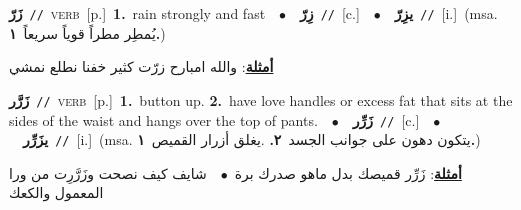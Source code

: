 \documentclass[10pt,a4paper,twoside]{article} %
\begin{document}
\begin{multicols}{2}
{\setlength\topsep{0pt}\textbf{\foreignlanguage{arabic}{زَرّ}}\ {\color{gray}\texttt{//}\color{black}}\ \textsc{verb}\ [p.]\ \textbf{1.}~rain strongly and fast\ \ $\bullet$\ \ \setlength\topsep{0pt}\textbf{\foreignlanguage{arabic}{زِرّ}}\ {\color{gray}\texttt{//}\color{black}}\ [c.]\ \ $\bullet$\ \ \setlength\topsep{0pt}\textbf{\foreignlanguage{arabic}{يزِرّ}}\ {\color{gray}\texttt{//}\color{black}}\ [i.]\ \color{gray}(msa. \foreignlanguage{arabic}{يُمطِر مطراً قوياً سريعاً}~\foreignlanguage{arabic}{\textbf{١.}})\color{black}\  \begin{flushright}\color{gray}\foreignlanguage{arabic}{\textbf{\underline{\foreignlanguage{arabic}{أمثلة}}}: والله امبارح زرّت كثير خفنا نطلع نمشي}\end{flushright}\color{black}} \vspace{2mm}

{\setlength\topsep{0pt}\textbf{\foreignlanguage{arabic}{زَرَّر}}\ {\color{gray}\texttt{//}\color{black}}\ \textsc{verb}\ [p.]\ \textbf{1.}~button up.  \textbf{2.}~have love handles or excess fat that sits at the sides of the waist and hangs over the top of pants.\ \ $\bullet$\ \ \setlength\topsep{0pt}\textbf{\foreignlanguage{arabic}{زَرِّر}}\ {\color{gray}\texttt{//}\color{black}}\ [c.]\ \ $\bullet$\ \ \setlength\topsep{0pt}\textbf{\foreignlanguage{arabic}{يزَرِّر}}\ {\color{gray}\texttt{//}\color{black}}\ [i.]\ \color{gray}(msa. \foreignlanguage{arabic}{يتكون دهون على جوانب الجسد}~\foreignlanguage{arabic}{\textbf{٢.}}  .\foreignlanguage{arabic}{يغلق أزرار القميص}~\foreignlanguage{arabic}{\textbf{١.}})\color{black}\  \begin{flushright}\color{gray}\foreignlanguage{arabic}{\textbf{\underline{\foreignlanguage{arabic}{أمثلة}}}: زَرِّر قميصك بدل ماهو صدرك برة\ $\bullet$\ \  شايف كيف نصحت وزَرَّرِت من ورا المعمول والكعك}\end{flushright}\color{black}} \vspace{2mm}


\end{multicols}
\end{document}
